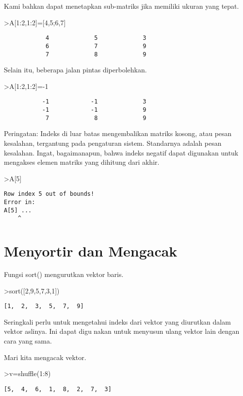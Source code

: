 \documentclass[
]{book}
\begin{document}
Kami bahkan dapat menetapkan sub-matriks jika memiliki ukuran yang tepat.

\textgreater A{[}1:2,1:2{]}={[}4,5;6,7{]}

\begin{verbatim}
            4             5             3 
            6             7             9 
            7             8             9 
\end{verbatim}

Selain itu, beberapa jalan pintas diperbolehkan.

\textgreater A{[}1:2,1:2{]}=-1

\begin{verbatim}
           -1            -1             3 
           -1            -1             9 
            7             8             9 
\end{verbatim}

Peringatan: Indeks di luar batas mengembalikan matriks kosong, atau pesan kesalahan, tergantung pada pengaturan sistem. Standarnya adalah pesan kesalahan. Ingat, bagaimanapun, bahwa indeks negatif dapat digunakan untuk mengakses elemen matriks yang dihitung dari akhir.

\textgreater A{[}5{]}

\begin{verbatim}
Row index 5 out of bounds!
Error in:
A[5] ...
    ^
\end{verbatim}

\chapter{Menyortir dan Mengacak}\label{menyortir-dan-mengacak}

Fungsi sort() mengurutkan vektor baris.

\textgreater sort({[}2,9,5,7,3,1{]})

\begin{verbatim}
[1,  2,  3,  5,  7,  9]
\end{verbatim}

Seringkali perlu untuk mengetahui indeks dari vektor yang diurutkan dalam vektor aslinya. Ini dapat digunakan untuk menyusun ulang vektor lain dengan cara yang sama.

Mari kita mengacak vektor.

\textgreater v=shuffle(1:8)

\begin{verbatim}
[5,  4,  6,  1,  8,  2,  7,  3]
\end{verbatim}
\end{document}
